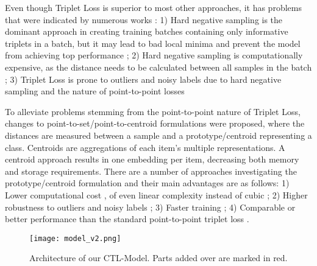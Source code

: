 \documentclass[sigconf,nonacm]{acmart}
\begin{document}
Even though Triplet Loss is superior to most other approaches, it has problems that were indicated by numerous works \cite{Do2019_triplet_upperbound, Zhang_rethinking_classifcation, Yuan_in_defense_of_the, Zhou_point_to_set}:
1) Hard negative sampling is the dominant approach in creating training batches containing only informative triplets in a batch, but it may lead to bad local minima and prevent the model from achieving top performance \cite{Do2019_triplet_upperbound, Zhang_rethinking_classifcation}; 2) Hard negative sampling is computationally expensive, as the distance needs to be calculated between all samples in the batch \cite{Do2019_triplet_upperbound, Yuan_in_defense_of_the}; 3) Triplet Loss is prone to outliers and noisy labels due to hard negative sampling and the nature of point-to-point losses \cite{Yuan_in_defense_of_the, Zhang_rethinking_classifcation}

To alleviate problems stemming from the point-to-point nature of Triplet Loss, changes to point-to-set/point-to-centroid formulations were proposed, where the distances are measured between a sample and a prototype/centroid representing a class. Centroids are aggregations of each item's multiple representations. A centroid approach results in one embedding per item, decreasing both memory and storage requirements. There are a number of approaches investigating the prototype/centroid formulation and their main advantages are as follows:
1) Lower computational cost \cite{Do2019_triplet_upperbound, Yuan_in_defense_of_the}, of even linear complexity instead of cubic \cite{Do2019_triplet_upperbound}; 2) Higher robustness to outliers and noisy labels \cite{Yuan_in_defense_of_the, Zhang_rethinking_classifcation}; 3) Faster training \cite{Wang_centroid_based}; 4) Comparable or better performance than the standard point-to-point triplet loss \cite{Wang_centroid_based,Yuan_in_defense_of_the,Lagunes-Fortiz_centroids_triplet}.

\begin{figure*}[!h]
  \centering
  \texttt{[image: model\_v2.png]}
  \caption{Architecture of our CTL-Model. Parts added over \cite{Wieczorek2020} are marked in red.}
\label{fig:model}
\end{figure*}
\end{document}
